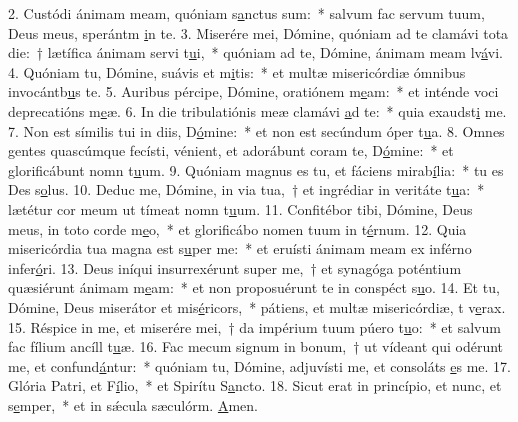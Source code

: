 2. Custódi ánimam meam, quóniam s\uline{a}nctus sum:~* salvum fac servum tuum, Deus meus, sperántm \uline{i}n te.
3. Miserére mei, Dómine, quóniam ad te clamávi tota die:~† lætífica ánimam servi t\uline{u}i,~* quóniam ad te, Dómine, ánimam meam lv\uline{á}vi.
4. Quóniam tu, Dómine, suávis et m\uline{i}tis:~* et multæ misericórdiæ ómnibus invocántb\uline{u}s te.
5. Auribus pércipe, Dómine, oratiónem m\uline{e}am:~* et inténde voci deprecatións m\uline{e}æ.
6. In die tribulatiónis meæ clamávi \uline{a}d te:~* quia exaudst\uline{i} me.
7. Non est símilis tui in diis, D\uline{ó}mine:~* et non est secúndum óper t\uline{u}a.
8. Omnes gentes quascúmque fecísti, vénient, et adorábunt coram te, D\uline{ó}mine:~* et glorificábunt nomn t\uline{u}um.
9. Quóniam magnus es tu, et fáciens mirab\uline{í}lia:~* tu es Des s\uline{o}lus.
10. Deduc me, Dómine, in via tua,~† et ingrédiar in veritáte t\uline{u}a:~* lætétur cor meum ut tímeat nomn t\uline{u}um.
11. Confitébor tibi, Dómine, Deus meus, in toto corde m\uline{e}o,~* et glorificábo nomen tuum in t\uline{é}rnum.
12. Quia misericórdia tua magna est s\uline{u}per me:~* et eruísti ánimam meam ex inférno infer\uline{ó}ri.
13. Deus iníqui insurrexérunt super me,~† et synagóga poténtium quæsiérunt ánimam m\uline{e}am:~* et non proposuérunt te in conspéct s\uline{u}o.
14. Et tu, Dómine, Deus miserátor et mis\uline{é}ricors,~* pátiens, et multæ misericórdiæ, t v\uline{e}rax.
15. Réspice in me, et miserére mei,~† da impérium tuum púero t\uline{u}o:~* et salvum fac fílium ancíll t\uline{u}æ.
16. Fac mecum signum in bonum,~† ut vídeant qui odérunt me, et confund\uline{á}ntur:~* quóniam tu, Dómine, adjuvísti me, et consoláts \uline{e}s me.
17. Glória Patri, et F\uline{í}lio,~* et Spirítu S\uline{a}ncto.
18. Sicut erat in princípio, et nunc, et s\uline{e}mper,~* et in sǽcula sæculórm. \uline{A}men.

